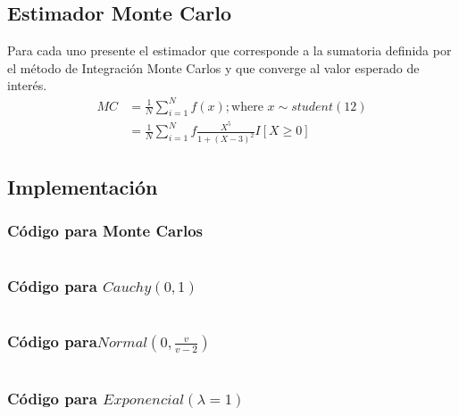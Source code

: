 \documentclass{article}
\begin{document}
\subsection{Estimador Monte Carlo}
Para cada uno presente el estimador que corresponde a la sumatoria definida por el método de Integración
Monte Carlos y que converge al valor esperado de interés.
\[
	\begin{split}
		MC & = \frac{1}{N}\sum_{i=1}^{N}f(x) ; \text{where } x \sim student(12) \\
		   & = \frac{1}{N}\sum_{i=1}^{N}f\frac{X^5}{1+(X - 3)^2}I[X \ge 0]
	\end{split}
\]


\subsection{Implementación}

\subsubsection{Código para Monte Carlos}
\begin{pythonbox}
	\inputminted{python}{code/mc.py}
\end{pythonbox}

\subsubsection{Código para $Cauchy(0,1)$}
\begin{pythonbox}
	\inputminted{python}{code/cauchy.py}
\end{pythonbox}

\subsubsection{Código para$Normal(0, \frac{v}{v-2})$}
\begin{pythonbox}
	\inputminted{python}{code/normal.py}
\end{pythonbox}

\subsubsection{Código para $Exponencial(\lambda=1)$}
\begin{pythonbox}
	\inputminted{python}{code/exp.py}
\end{pythonbox}
\end{document}
